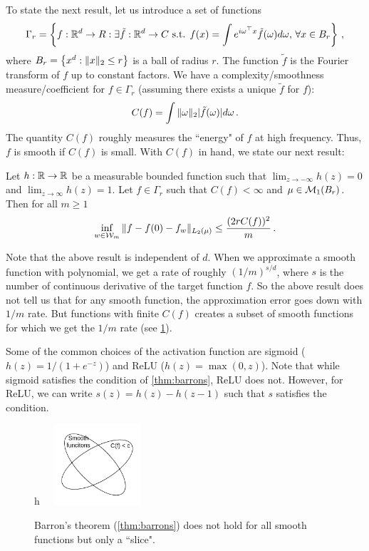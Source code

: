 \documentclass[twoside]{article}
\newcommand{\set}[1]{\left\{#1\right\}}
\newcommand{\cW}{\mathcal{W}}
\begin{document}
To state the next result, let us introduce a set of functions
\[
    \Gamma_r = \set{f:\R^d \to R: \exists \tilde f : \R^d \to C \text{ s.t. } f(x) = \int e^{i\omega^\top x} \tilde f(\omega) d\omega, \, \forall x \in B_r}\,,
\]
where $B_r = \set{x^d : \norm{x}_2 \le r}$ is a ball of radius $r$. The function $\tilde f$ is the Fourier transform of $f$ up to constant factors. We have a complexity/smoothness measure/coefficient for $f \in \Gamma_r$ (assuming there exists a unique $\tilde f$ for $f$):
\[
    C(f) = \int \|\omega\|_2 |\tilde f(\omega)| d\omega \,.
\]
The quantity $C(f)$ roughly measures the ``energy" of $f$ at high frequency. Thus, $f$ is smooth if $C(f)$ is small. With $C(f)$ in hand, we state our next result:   

\begin{theorem}[Barron, 1993]\label{thm:barrons}
    Let $h: \mathbb{R} \to \mathbb{R}$ be a measurable bounded function such that $\lim_{z \to -\infty} h(z) = 0$ and $\lim_{z \to \infty} h(z) = 1$. Let $f \in \Gamma_r$ such that $C(f) < \infty$ and $\mu \in \mathcal{M}_1(B_r)$. Then for all $m \ge 1$
    \[
        \inf_{w \in \cW_m} \norm{f - f(0) - f_w}_{L_2(\mu)} \le \frac{(2 r C(f))^2}{m}\,.
    \]
\end{theorem}
\begin{remark}
    Note that the above result is independent of $d$. When we approximate a smooth function with polynomial, we get a rate of roughly $(1/m)^{s/d}$, where $s$ is the number of continuous derivative of the target function $f$. So the above result does not tell us that for any smooth function, the approximation error goes down with $1/m$ rate. But functions with finite $C(f)$ creates a subset of smooth functions for which we get the $1/m$ rate (see \cref{fig:barrons-thm}).    
\end{remark}

\begin{remark}
    Some of the common choices of the activation function are sigmoid ($h(z) = 1/(1+e^{-z})$) and ReLU ($h(z) = \max(0,z)$). Note that while sigmoid satisfies the condition of \cref{thm:barrons}, ReLU does not. However, for ReLU, we can write $s(z) = h(z) - h(z-1)$ such that $s$ satisfies the condition.
\end{remark}

\begin{figure}{h}
    \centering
    \includegraphics[height=3cm, width=4cm]{figures/barrons-thm.png}
    \caption{Barron's theorem (\cref{thm:barrons}) does not hold for all smooth functions but only a ``slice".}
    \label{fig:barrons-thm}
\end{figure}
\end{document}
